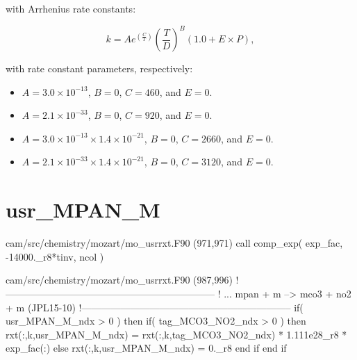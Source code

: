 \documentclass[titlepage]{article}
\begin{document}




\vspace{20px}

\noindent with Arrhenius rate constants:

\begin{equation}
k = Ae^{(\frac{C}{T})}(\frac{T}{D})^B(1.0+E \times P),
\end{equation}

\noindent with rate constant parameters, respectively:

\begin{itemize}
\item $A = 3.0 \times 10^{-13}$, $B = 0$, $C = 460$, and $E = 0$.
\item $A = 2.1 \times 10^{-33}$, $B = 0$, $C = 920$, and $E = 0$.
\item $A = 3.0 \times 10^{-13} \times 1.4 \times 10^{-21}$, $B = 0$, $C = 2660$, and $E = 0$.
\item $A = 2.1 \times 10^{-33} \times 1.4 \times 10^{-21}$, $B = 0$, $C = 3120$, and $E = 0$.
\end{itemize}


\section{usr\_MPAN\_M}

\begin{blockcode}[commandchars=\\\{\}]
\color{gray}cam/src/chemistry/mozart/mo_usrrxt.F90 (971,971)
       call comp_exp( exp_fac, -14000._r8*tinv, ncol )
\end{blockcode}
\begin{blockcode}[commandchars=\\\{\}]
\color{gray}cam/src/chemistry/mozart/mo_usrrxt.F90 (987,996)
!-----------------------------------------------------------------
! ... mpan + m --> mco3 + no2 + m (JPL15-10)
!-----------------------------------------------------------------
       if( usr_MPAN_M_ndx > 0 ) then
          if( tag_MCO3_NO2_ndx > 0 ) then
             rxt(:,k,usr_MPAN_M_ndx) = rxt(:,k,tag_MCO3_NO2_ndx) * 1.111e28_r8 * exp_fac(:)
          else
             rxt(:,k,usr_MPAN_M_ndx) = 0._r8
          end if
       end if
\end{blockcode}
\end{document}
